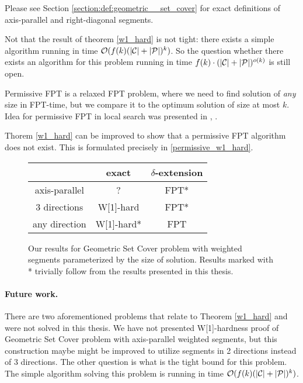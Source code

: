Please see Section \ref{section:def:geometric__set_cover}
for exact definitions of axis-parallel and right-diagonal segments.

Not that the result of theorem \ref{w1_hard} is not tight:
there exists a simple algorithm 
running in time ${\mathcal{O}(f(k)(|\mathcal{C}| + |\mathcal{P}|)^k)}$.
So the question whether there exists an algorithm
for this problem running in time ${f(k)\cdot(|\mathcal{C}| + |\mathcal{P}|)^{o(k)}}$
is still open.

Permissive FPT is a relaxed FPT problem, where 
we need to find solution of \textit{any} size in FPT-time,
but we compare it to the optimum solution of size at most $k$.
Idea for permissive FPT in local search was presented
in \cite{permissive_problem1}, \cite{permissive_problem2}.

Thorem \ref{w1_hard} can be improved to show that a permissive FPT
algorithm does not exist.
This is formulated precisely in \ref{permissive_w1_hard}.

\begin{figure}[h]
\begin{center}
\begin{tabular}{ | c | c | c | }
\hline
                & exact     & $\delta$-extension \\ 
\hline                
 axis-parallel   & ? & FPT* \\  
\hline                
 3 directions    & W[1]-hard & FPT* \\  
\hline                
 any direction   & W[1]-hard* & FPT \\
\hline                
\end{tabular}
\caption{Our results for Geometric Set Cover problem with weighted segments 
parameterized by the size of solution.
Results marked with * trivially follow from the results presented in this thesis.}
\label{tab:weighted_fpt}
\end{center}
\end{figure}

\paragraph{Future work.} There are two aforementioned problems
that relate to Theorem \ref{w1_hard} and were not solved in this thesis.
We have not presented W[1]-hardness proof
of Geometric Set Cover problem with axis-parallel weighted segments,
but this construction maybe might be improved to utilize segments
in 2 directions instead of 3 directions. 
The other question is what is the tight bound for this problem.
The simple algorithm solving
this problem is running in time ${\mathcal{O}(f(k)(|\mathcal{C}| + |\mathcal{P}|)^k)}$.

